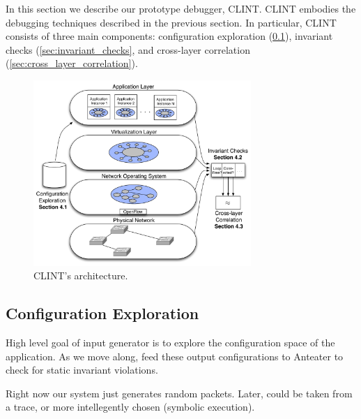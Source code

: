 
In this section we describe our prototype debugger, CLINT. CLINT embodies the
debugging techniques described in the previous section. In particular, CLINT
consists of three main components: configuration exploration
(\ref{sec:configuration_exploration}), invariant checks
(\ref{sec:invariant_checks}, and cross-layer correlation
(\ref{sec:cross_layer_correlation}).


\begin{figure}[t]
    \hspace{-10pt}
    \includegraphics[width=3.25in]{../diagrams/architecture/Architecture_simplified.pdf}
    \caption[]{\label{fig:basicarch} CLINT's architecture. \vspace{-10pt}} 
\end{figure}

\subsection{Configuration Exploration}
\label{sec:configuration_exploration}

High level goal of input generator is to explore the configuration space of
the application. As we move along, feed these output configurations to
Anteater to check for static invariant violations.


Right now our system just generates random packets. Later, could be taken from a trace, or
more intellegently chosen (\ie symbolic execution).

